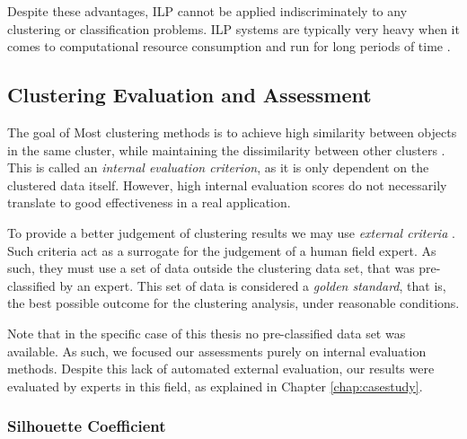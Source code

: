 Despite these advantages, ILP cannot be applied indiscriminately to any
clustering or classification problems. ILP systems are typically very heavy when
it comes to computational resource consumption and run for long periods of time
\cite{fonseca2003implementation}.

\subsection{Clustering Evaluation and Assessment}\label{sec:clustereval}

The goal of Most clustering methods is to achieve high similarity between
objects in the same cluster, while maintaining the dissimilarity between other
clusters \cite{Manning:2008:IIR:1394399}. This is called an \emph{internal
evaluation criterion}, as it is only dependent on the clustered data itself.
However, high internal evaluation scores do not necessarily translate to good
effectiveness in a real application.

To provide a better judgement of clustering results we may use \emph{external
criteria} \cite{Manning:2008:IIR:1394399}. Such criteria act as a surrogate for
the judgement of a human field expert. As such, they must use a set of data
outside the clustering data set, that was pre-classified by an expert. This set
of data is considered a \emph{golden standard}, that is, the best possible outcome for
the clustering analysis, under reasonable conditions.

Note that in the specific case of this thesis no pre-classified data set was
available. As such, we focused our assessments purely on internal evaluation
methods. Despite this lack of automated external evaluation, our results were
evaluated by experts in this field, as explained in Chapter \ref{chap:casestudy}.

\subsubsection*{Silhouette Coefficient}


